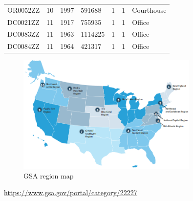 \documentclass[12pt]{article}
\begin{document}
\begin{longtable}{lllllll}
OR0052ZZ         & 10     & 1997        & 591688                     & 1     & 1            & Courthouse                       \\
DC0021ZZ         & 11     & 1917        & 755935                     & 1     & 1            & Office                           \\
DC0083ZZ         & 11     & 1963        & 1114225                    & 1     & 1            & Office                           \\
DC0084ZZ         & 11     & 1964        & 421317                     & 1     & 1            & Office                           \\
\hline
\end{longtable}
\FloatBarrier

\begin{figure}[h!]
  \centering
  \includegraphics[width=0.8\textwidth]{images/gsa_region.png}
  \caption{GSA region map}
  \label{fig:gsa_region}
\end{figure}
\FloatBarrier
\url{https://www.gsa.gov/portal/category/22227}
\end{document}
